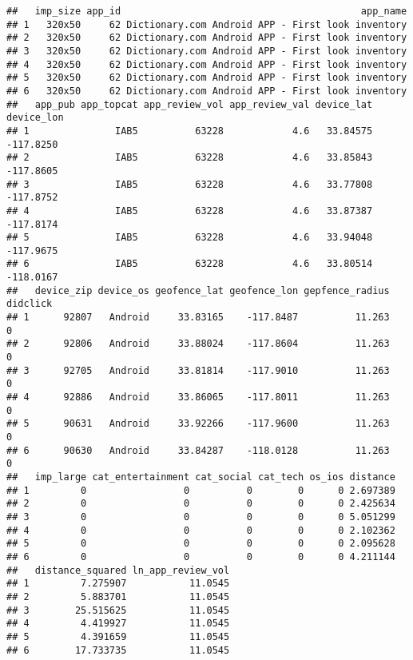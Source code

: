 \documentclass[]{article}
\begin{document}
\begin{verbatim}
##   imp_size app_id                                          app_name
## 1   320x50     62 Dictionary.com Android APP - First look inventory
## 2   320x50     62 Dictionary.com Android APP - First look inventory
## 3   320x50     62 Dictionary.com Android APP - First look inventory
## 4   320x50     62 Dictionary.com Android APP - First look inventory
## 5   320x50     62 Dictionary.com Android APP - First look inventory
## 6   320x50     62 Dictionary.com Android APP - First look inventory
##   app_pub app_topcat app_review_vol app_review_val device_lat device_lon
## 1               IAB5          63228            4.6   33.84575  -117.8250
## 2               IAB5          63228            4.6   33.85843  -117.8605
## 3               IAB5          63228            4.6   33.77808  -117.8752
## 4               IAB5          63228            4.6   33.87387  -117.8174
## 5               IAB5          63228            4.6   33.94048  -117.9675
## 6               IAB5          63228            4.6   33.80514  -118.0167
##   device_zip device_os geofence_lat geofence_lon gepfence_radius didclick
## 1      92807   Android     33.83165    -117.8487          11.263        0
## 2      92806   Android     33.88024    -117.8604          11.263        0
## 3      92705   Android     33.81814    -117.9010          11.263        0
## 4      92886   Android     33.86065    -117.8011          11.263        0
## 5      90631   Android     33.92266    -117.9600          11.263        0
## 6      90630   Android     33.84287    -118.0128          11.263        0
##   imp_large cat_entertainment cat_social cat_tech os_ios distance
## 1         0                 0          0        0      0 2.697389
## 2         0                 0          0        0      0 2.425634
## 3         0                 0          0        0      0 5.051299
## 4         0                 0          0        0      0 2.102362
## 5         0                 0          0        0      0 2.095628
## 6         0                 0          0        0      0 4.211144
##   distance_squared ln_app_review_vol
## 1         7.275907           11.0545
## 2         5.883701           11.0545
## 3        25.515625           11.0545
## 4         4.419927           11.0545
## 5         4.391659           11.0545
## 6        17.733735           11.0545
\end{verbatim}
\end{document}
